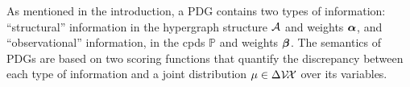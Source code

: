 \documentclass{article}
\begin{document}
As mentioned in the introduction, a PDG contains two types of information:
``structural'' information in the hypergraph structure $\mathcal A$ and
weights $\boldsymbol\alpha$, and ``observational'' information, 
in the cpds 
$\mathbb P$ and weights $\boldsymbol\beta$.
The semantics of PDGs are based on two scoring functions
that quantify the discrepancy between 
each type of information and a joint distribution
$\mu \in \Delta \mathcal V \!\mathcal X$ over its variables.
\end{document}
